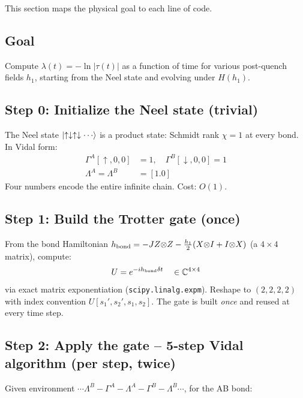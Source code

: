 \documentclass[11pt, a4paper]{article}
\begin{document}
This section maps the physical goal to each line of code.

\subsection{Goal}

Compute $\lambda(t) = -\ln|\tau(t)|$ as a function of time for various post-quench fields $h_1$, starting from the Neel state and evolving under $H(h_1)$.

\subsection{Step 0: Initialize the Neel state (trivial)}

The Neel state $\ket{\uparrow\downarrow\uparrow\downarrow\cdots}$ is a product state: Schmidt rank $\chi = 1$ at every bond. In Vidal form:
\begin{align*}
  \Gamma^A[{\uparrow}, 0, 0] &= 1, \quad \Gamma^B[{\downarrow}, 0, 0] = 1 \\
  \Lambda^A = \Lambda^B &= [1.0]
\end{align*}
Four numbers encode the entire infinite chain. Cost: $O(1)$.

\subsection{Step 1: Build the Trotter gate (once)}

From the bond Hamiltonian $h_{\rm bond} = -J Z{\otimes}Z - \tfrac{h_1}{2}(X{\otimes}I + I{\otimes}X)$ (a $4\times 4$ matrix), compute:
\begin{equation}
  U = e^{-i h_{\rm bond} \delta t} \quad \in \mathbb{C}^{4\times 4}
\end{equation}
via exact matrix exponentiation (\texttt{scipy.linalg.expm}). Reshape to $(2,2,2,2)$ with index convention $U[s_1', s_2', s_1, s_2]$. The gate is built \emph{once} and reused at every time step.

\subsection{Step 2: Apply the gate -- 5-step Vidal algorithm (per step, twice)}

Given environment $\cdots \Lambda^B {-} \Gamma^A {-} \Lambda^A {-} \Gamma^B {-} \Lambda^B \cdots$, for the AB bond:
\end{document}
